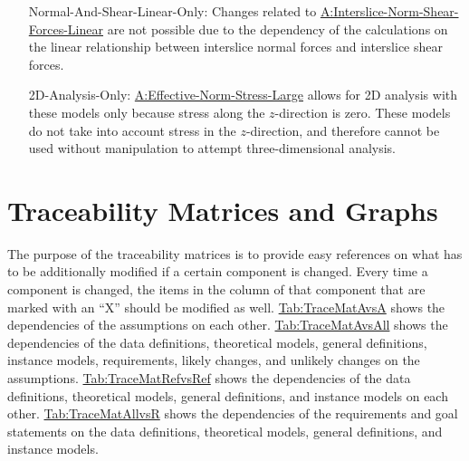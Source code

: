 \documentclass[12pt]{article}
\begin{document}
\begin{itemize}
\item[Normal-And-Shear-Linear-Only:\phantomsection\label{UC_normshearlinear}]{Changes related to \hyperref[assumpINSFL]{A:Interslice-Norm-Shear-Forces-Linear} are not possible due to the dependency of the calculations on the linear relationship between interslice normal forces and interslice shear forces.}
\item[2D-Analysis-Only:\phantomsection\label{UC_2donly}]{\hyperref[assumpENSL]{A:Effective-Norm-Stress-Large} allows for 2D analysis with these models only because stress along the $z$-direction is zero. These models do not take into account stress in the $z$-direction, and therefore cannot be used without manipulation to attempt three-dimensional analysis.}
\end{itemize}
\section{Traceability Matrices and Graphs}
\label{Sec:TraceMatrices}
The purpose of the traceability matrices is to provide easy references on what has to be additionally modified if a certain component is changed. Every time a component is changed, the items in the column of that component that are marked with an ``X'' should be modified as well. \hyperref[Table:TraceMatAvsA]{Tab:TraceMatAvsA} shows the dependencies of the assumptions on each other. \hyperref[Table:TraceMatAvsAll]{Tab:TraceMatAvsAll} shows the dependencies of the data definitions, theoretical models, general definitions, instance models, requirements, likely changes, and unlikely changes on the assumptions. \hyperref[Table:TraceMatRefvsRef]{Tab:TraceMatRefvsRef} shows the dependencies of the data definitions, theoretical models, general definitions, and instance models on each other. \hyperref[Table:TraceMatAllvsR]{Tab:TraceMatAllvsR} shows the dependencies of the requirements and goal statements on the data definitions, theoretical models, general definitions, and instance models.
\end{document}
